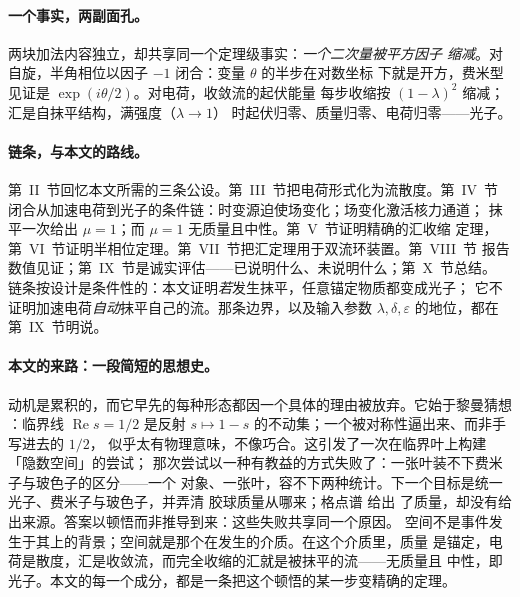 \documentclass[aps,prd,preprint,superscriptaddress,amsmath,amssymb]{revtex4-2}
\begin{document}
\paragraph{一个事实，两副面孔。}
两块加法内容独立，却共享同一个定理级事实：\emph{一个二次量被平方因子
缩减}。对自旋，半角相位以因子 $-1$ 闭合：变量 $\theta$ 的半步在对数坐标
下就是开方，费米型见证是 $\exp(i\theta/2)$。对电荷，收敛流的起伏能量
每步收缩按 $(1-\lambda)^2$ 缩减；汇是自抹平结构，满强度（$\lambda\to 1$）
时起伏归零、质量归零、电荷归零——光子。

\paragraph{链条，与本文的路线。}
第~II~节回忆本文所需的三条公设。第~III~节把电荷形式化为流散度。第~IV~节
闭合从加速电荷到光子的条件链：时变源迫使场变化；场变化激活核力通道；
抹平一次给出 $\mu=1$；而 $\mu=1$ 无质量且中性。第~V~节证明精确的汇收缩
定理，第~VI~节证明半相位定理。第~VII~节把汇定理用于双流环装置。第~VIII~节
报告数值见证；第~IX~节是诚实评估——已说明什么、未说明什么；第~X~节总结。
链条按设计是条件性的：本文证明\emph{若}发生抹平，任意锚定物质都变成光子；
它不证明加速电荷\emph{自动}抹平自己的流。那条边界，以及输入参数
$\lambda,\delta,\varepsilon$ 的地位，都在第~IX~节明说。

\paragraph{本文的来路：一段简短的思想史。}
动机是累积的，而它早先的每种形态都因一个具体的理由被放弃。它始于黎曼猜想
\cite{riemann1859ueber}：临界线 $\operatorname{Re}s=1/2$ 是反射
$s\mapsto 1-s$ 的不动集；一个被对称性逼出来、而非手写进去的 $1/2$，
似乎太有物理意味，不像巧合。这引发了一次在临界叶上构建「隐数空间」的尝试；
那次尝试以一种有教益的方式失败了：一张叶装不下费米子与玻色子的区分——一个
对象、一张叶，容不下两种统计。下一个目标是统一光子、费米子与玻色子，并弄清
胶球质量从哪来；格点谱 \cite{morningstar1999glueball,chen2006glueball} 给出
了质量，却没有给出来源。答案以顿悟而非推导到来：这些失败共享同一个原因。
空间不是事件发生于其上的背景；空间就是那个在发生的介质。在这个介质里，质量
是锚定，电荷是散度，汇是收敛流，而完全收缩的汇就是被抹平的流——无质量且
中性，即光子。本文的每一个成分，都是一条把这个顿悟的某一步变精确的定理。
\end{document}
